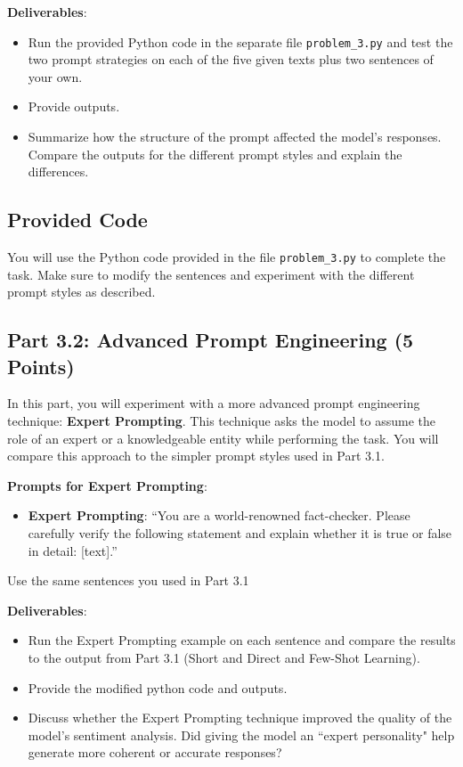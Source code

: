 \documentclass[11pt, oneside]{article}   	%
\begin{document}
\textbf{Deliverables}:
\begin{itemize}
    \item Run the provided Python code in the separate file \texttt{problem\_3.py} and test the two prompt strategies on each of the five given texts plus two sentences of your own.
    \item Provide outputs.
    \item Summarize how the structure of the prompt affected the model’s responses. Compare the outputs for the different prompt styles and explain the differences.
\end{itemize}

\subsection*{Provided Code}
You will use the Python code provided in the file \texttt{problem\_3.py} to complete the task. Make sure to modify the sentences and experiment with the different prompt styles as described.

\subsection*{Part 3.2: Advanced Prompt Engineering (5 Points)}

In this part, you will experiment with a more advanced prompt engineering technique: \textbf{Expert Prompting}. This technique asks the model to assume the role of an expert or a knowledgeable entity while performing the task. You will compare this approach to the simpler prompt styles used in Part 3.1.

\textbf{Prompts for Expert Prompting}:
\begin{itemize}
    \item \textbf{Expert Prompting}: “You are a world-renowned fact-checker. Please carefully verify the following statement and explain whether it is true or false in detail: [text].”
\end{itemize}

Use the same sentences you used in Part 3.1

\textbf{Deliverables}:
\begin{itemize}
    \item Run the Expert Prompting example on each sentence and compare the results to the output from Part 3.1 (Short and Direct and Few-Shot Learning).
    \item Provide the modified python code and outputs.
    \item Discuss whether the Expert Prompting technique improved the quality of the model’s sentiment analysis. Did giving the model an ``expert personality" help generate more coherent or accurate responses?
\end{itemize}
\end{document}
